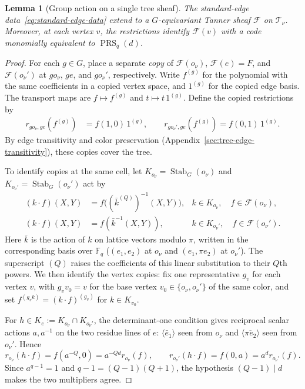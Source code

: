 \documentclass[11pt,letterpaper]{article}
\newtheorem{lemma}[theorem]{Lemma}
\theoremstyle{definition}
\theoremstyle{remark}
\newcommand{\F}{\mathbb F}
\newcommand{\cF}{\mathcal F}
\begin{document}
\begin{lemma}[Group action on a single tree sheaf]
\label{lem:matching-characters}\label{prop:tree-coefficients}
The standard-edge data~\eqref{eq:standard-edge-data} extend to a
$G$-equivariant Tanner sheaf $\cF$ on $\mathcal T_\nu$.
Moreover, at each vertex $v$, the restrictions identify $\cF(v)$ with
a code monomially equivalent to $\operatorname{PRS}_q(d)$.
\end{lemma}
\begin{proof}
For each $g\in G$, place a separate \emph{copy} of
$\cF(o_\nu)$, $\cF(e)=F$, and $\cF(o_\nu')$
at $go_\nu$, $ge$, and $go_\nu'$, respectively.
Write $f^{(g)}$ for the polynomial with the same coefficients in a
copied vertex space, and $1^{(g)}$ for the copied edge basis.
The transport maps are $f\mapsto f^{(g)}$ and $t\mapsto t\,1^{(g)}$.
Define the copied restrictions by
\[
 \begin{aligned}
 r_{go_\nu,ge}(f^{(g)})&=f(1,0)\,1^{(g)},\qquad
 r_{go_\nu',ge}(f^{(g)})=f(0,1)\,1^{(g)}.
 \end{aligned}
\]
By edge transitivity and color preservation
(Appendix~\ref{sec:tree-edge-transitivity}), these copies cover the tree.

To identify copies at the same cell, let
$K_{o_\nu}=\operatorname{Stab}_G(o_\nu)$ and
$K_{o_\nu'}=\operatorname{Stab}_G(o_\nu')$ act by
\[
 \begin{aligned}
 (k\cdot f)(X,Y)&=f\bigl((\bar k^{(Q)})^{-1}(X,Y)\bigr),
 &k\in K_{o_\nu},\quad f\in\cF(o_\nu),\\
 (k\cdot f)(X,Y)&=f(\bar k^{-1}(X,Y)),
 &k\in K_{o_\nu'},\quad f\in\cF(o_\nu').
 \end{aligned}
\]
Here $\bar k$ is the action of $k$ on lattice vectors modulo $\pi$,
written in the corresponding basis over $\F_q$ ($(e_1,e_2)$ at $o_\nu$ and $(e_1,\pi e_2)$ at $o_\nu'$). The superscript $(Q)$
raises the coefficients of this linear substitution to their $Q$th powers.
We then identify the vertex copies: fix one representative $g_v$ for each
vertex $v$, with $g_vv_0=v$ for the base vertex $v_0\in\{o_\nu,o_\nu'\}$ of
the same color, and set $f^{(g_vk)}=(k\cdot f)^{(g_v)}$ for $k\in K_{v_0}$.

For $h\in K_e:=K_{o_\nu}\cap K_{o_\nu'}$, the determinant-one condition
gives reciprocal scalar actions $a,a^{-1}$ on the two residue lines of $e$: $\langle\bar e_1\rangle$ seen from
$o_\nu$ and $\langle\overline{\pi e_2}\rangle$ seen from $o_\nu'$. Hence
\[
 r_{o_\nu}(h\cdot f)=f(a^{-Q},0)=a^{-Qd}r_{o_\nu}(f),\qquad
 r_{o_\nu'}(h\cdot f)=f(0,a)=a^d r_{o_\nu'}(f).
\]
Since $a^{q-1}=1$ and $q-1=(Q-1)(Q+1)$, the hypothesis $(Q-1)\mid d$
makes the two multipliers agree.


\end{proof}
\end{document}
